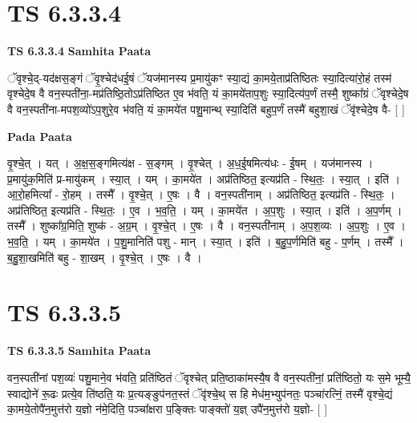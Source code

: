 \documentclass[17pt]{extarticle}
\begin{document}

\section{ TS 6.3.3.4 }

\textbf{TS 6.3.3.4 } \newline
\textbf{Samhita Paata} \newline

ॅवृश्चे॒द्-यद॑क्षस॒ङ्गं ॅवृ॒श्चेद॑धई॒षं ॅयज॑मानस्य प्र॒मायु॑कꣳ स्या॒द्यं का॒मये॒ताप्र॑तिष्ठितः स्या॒दित्या॑रो॒हं तस्म॑ वृश्चेदे॒ष वै वन॒स्पती॑ना॒-मप्र॑तिष्ठि॒तोऽप्र॑तिष्ठित ए॒व भ॑वति॒ यं का॒मये॑ताप॒शुः स्या॒दित्य॑प॒र्णं तस्मै॒ शुष्का᳚ग्रं ॅवृश्चेदे॒ष वै वन॒स्पती॑ना-मपश॒व्यो॑ऽप॒शुरे॒व भ॑वति॒ यं का॒मये॑त पशु॒मान्थ् स्या॒दिति॑ बहुप॒र्णं तस्मै॑ बहुशा॒खं ॅवृ॑श्चेदे॒ष वै- [  ] \newline

\textbf{Pada Paata} \newline

वृ॒श्चे॒त् । यत् । अ॒क्ष॒स॒ङ्गमित्य॑क्ष - स॒ङ्गम् । वृ॒श्चेत् । अ॒ध॒ई॒षमित्य॑धः - ई॒षम् । यज॑मानस्य । प्र॒मायु॑क॒मिति॑ प्र-मायु॑कम् । स्या॒त् । यम् । का॒मये॑त । अप्र॑तिष्ठित॒ इत्यप्र॑ति - स्थि॒तः॒ । स्या॒त् । इति॑ । आ॒रो॒हमित्या᳚ - रो॒हम् । तस्मै᳚ । वृ॒श्चे॒त् । ए॒षः । वै । वन॒स्पती॑नाम् । अप्र॑तिष्ठित॒ इत्यप्र॑ति - स्थि॒तः॒ । अप्र॑तिष्ठित॒ इत्यप्र॑ति - स्थि॒तः॒ । ए॒व । भ॒व॒ति॒ । यम् । का॒मये॑त । अ॒प॒शुः । स्या॒त् । इति॑ । अ॒प॒र्णम् । तस्मै᳚ । शुष्का᳚ग्र॒मिति॒ शुष्क॑ - अ॒ग्र॒म् । वृ॒श्चे॒त् । ए॒षः । वै । वन॒स्पती॑नाम् । अ॒प॒श॒व्यः । अ॒प॒शुः । ए॒व । भ॒व॒ति॒ । यम् । का॒मये॑त । प॒शु॒मानिति॑ पशु - मान् । स्या॒त् । इति॑ । ब॒हु॒प॒र्णमिति॑ बहु - प॒र्णम् । तस्मै᳚ । ब॒हु॒शा॒खमिति॑ बहु - शा॒खम् । वृ॒श्चे॒त् । ए॒षः । वै ।  \newline





\section{ TS 6.3.3.5 }

\textbf{TS 6.3.3.5 } \newline
\textbf{Samhita Paata} \newline

वन॒स्पती॑नां पश॒व्यः॑ पशु॒माने॒व भ॑वति॒ प्रति॑ष्ठितं ॅवृश्चेत् प्रति॒ष्ठाका॑मस्यै॒ष वै वन॒स्पती॑नां॒ प्रति॑ष्ठितो॒ यः स॒मे भूम्यै॒ स्वाद्योने॑ रू॒ढः प्रत्ये॒व ति॑ष्ठति॒ यः प्र॒त्यङ्ङुप॑नत॒स्तं ॅवृ॑श्चे॒थ् स हि मेध॑म॒भ्युप॑नतः॒ पञ्चा॑रत्निं॒ तस्मै॑ वृश्चे॒द्यं का॒मये॒तोपै॑न॒मुत्त॑रो य॒ज्ञो न॑मे॒दिति॒ पञ्चा᳚क्षरा प॒ङ्क्तिः पाङ्क्तो॑ य॒ज्ञ् उपै॑न॒मुत्त॑रो य॒ज्ञो- [  ] \newline
\end{document}
